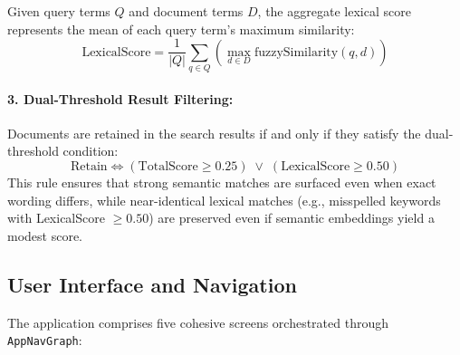 Given query terms $Q$ and document terms $D$, the aggregate lexical score represents the mean of each query term's maximum similarity:
\begin{equation}
\text{LexicalScore} = \frac{1}{|Q|} \sum_{q \in Q} \left( \max_{d \in D} \text{fuzzySimilarity}(q, d) \right)
\end{equation}

\paragraph{3. Dual-Threshold Result Filtering:}
Documents are retained in the search results if and only if they satisfy the dual-threshold condition:
\begin{equation}
\text{Retain} \iff \left( \text{TotalScore} \ge 0.25 \right) \;\lor\; \left( \text{LexicalScore} \ge 0.50 \right)
\end{equation}
This rule ensures that strong semantic matches are surfaced even when exact wording differs, while near-identical lexical matches (e.g., misspelled keywords with LexicalScore $\ge 0.50$) are preserved even if semantic embeddings yield a modest score.

\subsection{User Interface and Navigation}

The application comprises five cohesive screens orchestrated through \texttt{AppNavGraph}:

